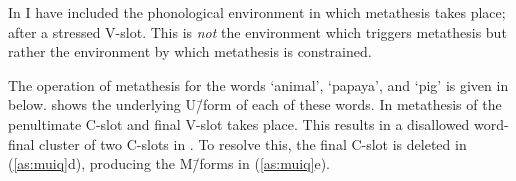 In  I have included the phonological environment
in which metathesis takes place; after a stressed V-slot.
This is \emph{not} the environment which triggers metathesis
but rather the environment by which metathesis is constrained.

\begin{exe}
	\label{ex:CV->VC/'V-}
\end{exe}

The operation of metathesis for the words  `animal',
 `papaya', and  `pig' %
is given in  below.
 shows the underlying U\=/form of each of these words.
In  metathesis of the penultimate C-slot and final V-slot takes place.
This results in a disallowed word-final cluster of two C-slots in .
To resolve this, the final C-slot is deleted in (\ref{as:muiq}d),
producing the M\=/forms in (\ref{as:muiq}e).
%

